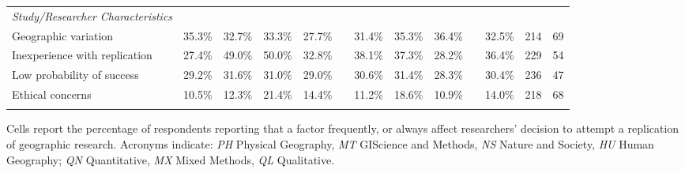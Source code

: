 \documentclass[]{interact}
\theoremstyle{plain}%
\theoremstyle{definition}
\theoremstyle{remark}
\begin{document}
\begin{landscape}
\begin{table}[h]
\begin{threeparttable}
\begin{tabular}{l c c c c c c c c c c c c}
         \textit{Study/Researcher Characteristics}     & & & & & & & & & & & & \\
         Geographic variation               & 35.3\% & 32.7\% & 33.3\% & 27.7\% & & 31.4\% & 35.3\% & 36.4\% & & 32.5\% & 214 & 69 \\
         Inexperience with replication      & 27.4\% & 49.0\% & 50.0\% & 32.8\% & & 38.1\% & 37.3\% & 28.2\% & & 36.4\% & 229 & 54 \\
         Low probability of success         & 29.2\% & 31.6\% & 31.0\% & 29.0\% & & 30.6\% & 31.4\% & 28.3\% & & 30.4\% & 236 & 47 \\
         Ethical concerns                   & 10.5\% & 12.3\% & 21.4\% & 14.4\% & & 11.2\% & 18.6\% & 10.9\% & & 14.0\% & 218 & 68 \\
                                            & & & & & & & & & & & & \\
        \hline
    \end{tabular}
    \begin{tablenotes}
        \footnotesize
        \item Cells report the percentage of respondents reporting that a factor frequently, or always affect researchers' decision to attempt a replication of geographic research. Acronyms indicate: \textit{PH} Physical Geography, \textit{MT} GIScience and Methods, \textit{NS} Nature and Society, \textit{HU} Human Geography; \textit{QN} Quantitative, \textit{MX} Mixed Methods, \textit{QL} Qualitative. 
    \end{tablenotes}
    \label{tab:motivations}
    \end{threeparttable}
\end{table}
\end{landscape}

\newpage
\end{document}
